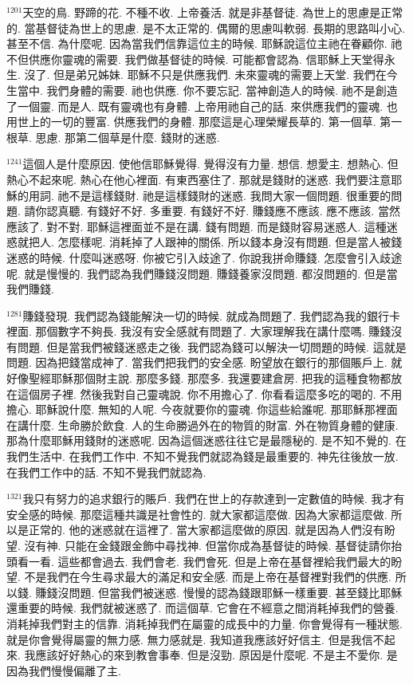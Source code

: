\documentclass{book}
\begin{document}
$^{1201}$天空的鳥.
野蹄的花.
不種不收.
上帝養活.
就是非基督徒.
為世上的思慮是正常的.
當基督徒為世上的思慮.
是不太正常的.
偶爾的思慮叫軟弱.
長期的思路叫小心.
甚至不信.
為什麼呢.
因為當我們信靠這位主的時候.
耶穌說這位主祂在眷顧你.
祂不但供應你靈魂的需要.
我們做基督徒的時候.
可能都會認為.
信耶穌上天堂得永生.
沒了.
但是弟兄姊妹.
耶穌不只是供應我們.
未來靈魂的需要上天堂.
我們在今生當中.
我們身體的需要.
祂也供應.
你不要忘記.
當神創造人的時候.
祂不是創造了一個靈.
而是人.
既有靈魂也有身體.
上帝用祂自己的話.
來供應我們的靈魂.
也用世上的一切的豐富.
供應我們的身體.
那麼這是心理榮耀長草的.
第一個草.
第一根草.
思慮.
那第二個草是什麼.
錢財的迷惑.

$^{1241}$這個人是什麼原因.
使他信耶穌覺得.
覺得沒有力量.
想信.
想愛主.
想熱心.
但熱心不起來呢.
熱心在他心裡面.
有東西塞住了.
那就是錢財的迷惑.
我們要注意耶穌的用詞.
祂不是這樣錢財.
祂是這樣錢財的迷惑.
我問大家一個問題.
很重要的問題.
請你認真聽.
有錢好不好.
多重要.
有錢好不好.
賺錢應不應該.
應不應該.
當然應該了.
對不對.
耶穌這裡面並不是在講.
錢有問題.
而是錢財容易迷惑人.
這種迷惑就把人.
怎麼樣呢.
消耗掉了人跟神的關係.
所以錢本身沒有問題.
但是當人被錢迷惑的時候.
什麼叫迷惑呀.
你被它引入歧途了.
你說我拼命賺錢.
怎麼會引入歧途呢.
就是慢慢的.
我們認為我們賺錢沒問題.
賺錢養家沒問題.
都沒問題的.
但是當我們賺錢.

$^{1281}$賺錢發現.
我們認為錢能解決一切的時候.
就成為問題了.
我們認為我的銀行卡裡面.
那個數字不夠長.
我沒有安全感就有問題了.
大家理解我在講什麼嗎.
賺錢沒有問題.
但是當我們被錢迷惑走之後.
我們認為錢可以解決一切問題的時候.
這就是問題.
因為把錢當成神了.
當我們把我們的安全感.
盼望放在銀行的那個賬戶上.
就好像聖經耶穌那個財主說.
那麼多錢.
那麼多.
我還要建倉房.
把我的這種食物都放在這個房子裡.
然後我對自己靈魂說.
你不用擔心了.
你看看這麼多吃的喝的.
不用擔心.
耶穌說什麼.
無知的人呢.
今夜就要你的靈魂.
你這些給誰呢.
那耶穌那裡面在講什麼.
生命勝於飲食.
人的生命勝過外在的物質的財富.
外在物質身體的健康.
那為什麼耶穌用錢財的迷惑呢.
因為這個迷惑往往它是最隱秘的.
是不知不覺的.
在我們生活中.
在我們工作中.
不知不覺我們就認為錢是最重要的.
神先往後放一放.
在我們工作中的話.
不知不覺我們就認為.

$^{1321}$我只有努力的追求銀行的賬戶.
我們在世上的存款達到一定數值的時候.
我才有安全感的時候.
那麼這種共識是社會性的.
就大家都這麼做.
因為大家都這麼做.
所以是正常的.
他的迷惑就在這裡了.
當大家都這麼做的原因.
就是因為人們沒有盼望.
沒有神.
只能在金錢跟金飾中尋找神.
但當你成為基督徒的時候.
基督徒請你抬頭看一看.
這些都會過去.
我們會老.
我們會死.
但是上帝在基督裡給我們最大的盼望.
不是我們在今生尋求最大的滿足和安全感.
而是上帝在基督裡對我們的供應.
所以錢.
賺錢沒問題.
但當我們被迷惑.
慢慢的認為錢跟耶穌一樣重要.
甚至錢比耶穌還重要的時候.
我們就被迷惑了.
而這個草.
它會在不經意之間消耗掉我們的營養.
消耗掉我們對主的信靠.
消耗掉我們在屬靈的成長中的力量.
你會覺得有一種狀態.
就是你會覺得屬靈的無力感.
無力感就是.
我知道我應該好好信主.
但是我信不起來.
我應該好好熱心的來到教會事奉.
但是沒勁.
原因是什麼呢.
不是主不愛你.
是因為我們慢慢偏離了主.
\end{document}
